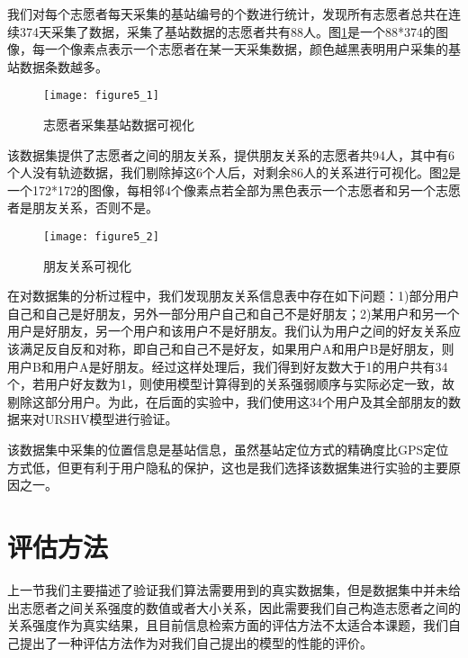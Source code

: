 \par 我们对每个志愿者每天采集的基站编号的个数进行统计，发现所有志愿者总共在连续374天采集了数据，采集了基站数据的志愿者共有88人。图\ref{fig:5_1}是一个88*374的图像，每一个像素点表示一个志愿者在某一天采集数据，颜色越黑表明用户采集的基站数据条数越多。
\begin{figure}[htp]
\centering
\texttt{[image: figure5\_1]}
\caption{志愿者采集基站数据可视化}
\label{fig:5_1}
\end{figure}
\par 该数据集提供了志愿者之间的朋友关系，提供朋友关系的志愿者共94人，其中有6个人没有轨迹数据，我们剔除掉这6个人后，对剩余86人的关系进行可视化。图\ref{fig:5_2}是一个172*172的图像，每相邻4个像素点若全部为黑色表示一个志愿者和另一个志愿者是朋友关系，否则不是。
\begin{figure}[htp]
\centering
\texttt{[image: figure5\_2]}
\caption{朋友关系可视化}
\label{fig:5_2}
\end{figure}
\par 在对数据集的分析过程中，我们发现朋友关系信息表中存在如下问题：1)部分用户自己和自己是好朋友，另外一部分用户自己和自己不是好朋友；2)某用户和另一个用户是好朋友，另一个用户和该用户不是好朋友。我们认为用户之间的好友关系应该满足反自反和对称，即自己和自己不是好友，如果用户A和用户B是好朋友，则用户B和用户A是好朋友。经过这样处理后，我们得到好友数大于1的用户共有34个，若用户好友数为1，则使用模型计算得到的关系强弱顺序与实际必定一致，故剔除这部分用户。为此，在后面的实验中，我们使用这34个用户及其全部朋友的数据来对URSHV模型进行验证。
\par 该数据集中采集的位置信息是基站信息，虽然基站定位方式的精确度比GPS定位方式低，但更有利于用户隐私的保护，这也是我们选择该数据集进行实验的主要原因之一。
\section{评估方法}
\label{sec:section5-2}
上一节我们主要描述了验证我们算法需要用到的真实数据集，但是数据集中并未给出志愿者之间关系强度的数值或者大小关系，因此需要我们自己构造志愿者之间的关系强度作为真实结果，且目前信息检索方面的评估方法不太适合本课题，我们自己提出了一种评估方法作为对我们自己提出的模型的性能的评价。
